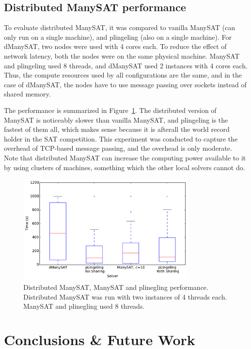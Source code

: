 \documentclass{article}
\begin{document}
\clearpage
\subsection{Distributed ManySAT performance}

To evaluate distributed ManySAT, it was compared to vanilla ManySAT
(can only run on a single machine), and plingeling (also on a single
machine). For dManySAT, two nodes were used with 4 cores each. To
reduce the effect of network latency, both the nodes were on the same
physical machine. ManySAT and plingeling used 8 threads, and dManySAT
used 2 instances with 4 cores each. Thus, the compute resources used
by all configurations are the same, and in the case of dManySAT, the
nodes have to use message passing over sockets instead of shared memory. 

The performance is summarized in Figure~\ref{fig:cmp-1}. The distributed
version of ManySAT is noticeably slower than vanilla ManySAT, and
plingeling is the fastest of them all, which makes sense because it is
afterall the world record holder in the SAT competition. This
experiment was conducted to capture the overhead of TCP-based message
passing, and the overhead is only moderate. Note that distributed
ManySAT can increase the computing power available to it by using
clusters of machines, something which the other local solvers cannot
do.




\begin{figure}[h]
  \centering
  \includegraphics[width=0.8\textwidth]{../figs/cmp_box.pdf}
  \caption{Distributed ManySAT, ManySAT and plinegling performance. Distributed ManySAT was run with two instances of 4 threads each. ManySAT and plinegling used 8 threads.}
  \label{fig:cmp-1}
\end{figure}


\clearpage

\section{Conclusions \& Future Work}
\end{document}
